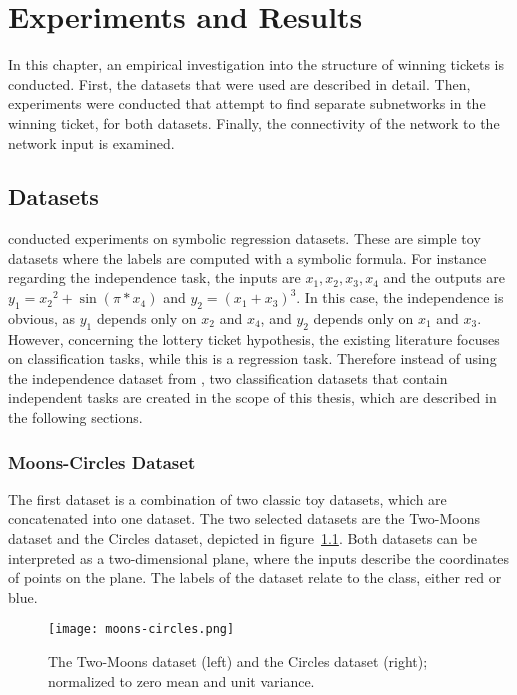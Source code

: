 \chapter{Experiments and Results}\label{chapter:experiments} 
In this chapter, an empirical investigation into the structure of winning tickets is conducted.
First, the datasets that were used are described in detail.
Then, experiments were conducted that attempt to find separate subnetworks in the winning ticket, for both datasets.
Finally, the connectivity of the network to the network input is examined.

\section{Datasets}
\textcite{BIMT} conducted experiments on symbolic regression datasets.
These are simple toy datasets where the labels are computed with a symbolic formula. 
For instance regarding the independence task, the inputs are $x_1, x_2, x_3, x_4$ and the outputs are $y_1={x_2}^2 + \sin{(\pi*x_4)}$ and $y_2={(x_1+x_3)}^3$.
In this case, the independence is obvious, as $y_1$ depends only on $x_2$ and $x_4$, and $y_2$ depends only on $x_1$ and $x_3$.
However, concerning the lottery ticket hypothesis, the existing literature focuses on classification tasks, while this is a regression task.
Therefore instead of using the independence dataset from \textcite{BIMT}, 
two classification datasets that contain independent tasks are created in the scope of this thesis, which are described in the following sections.

\subsection{Moons-Circles Dataset}\label{sec:independece_dataset}
The first dataset is a combination of two classic toy datasets, which are concatenated into one dataset.
The two selected datasets are the Two-Moons dataset and the Circles dataset, depicted in figure~\ref{fig:moons_circles}.
Both datasets can be interpreted as a two-dimensional plane, where the inputs describe the coordinates of points on the plane. 
The labels of the dataset relate to the class, either red or blue.

\begin{figure}
\centering \texttt{[image: moons-circles.png]}
\caption[Two-Moons and Circles Dataset]{
    The Two-Moons dataset (left) and the Circles dataset (right); normalized to zero mean and unit variance.}\label{fig:moons_circles}
\end{figure}

